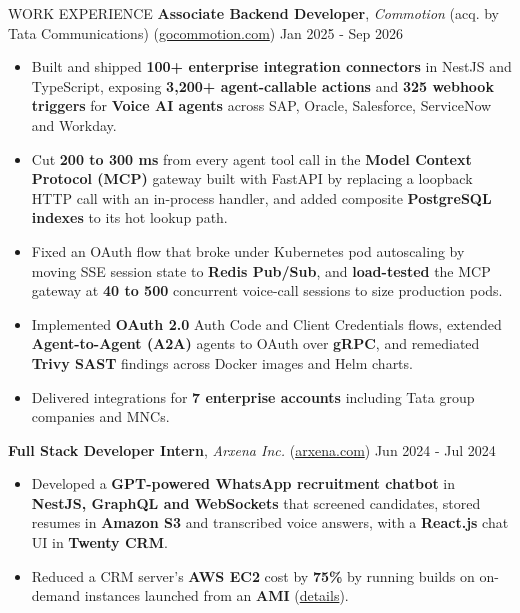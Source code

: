 \documentclass{resume} %
\begin{document}
\begin{rSection}{WORK EXPERIENCE}
\textbf{Associate Backend Developer}, \textit{Commotion} (acq. by Tata Communications) (\href{https://gocommotion.com}{gocommotion.com})  \hfill Jan 2025 - Sep 2026
\begin{itemize}
        \itemsep -6pt {}
    \item Built and shipped \textbf{100+ enterprise integration connectors} in NestJS and TypeScript, exposing \textbf{3,200+ agent-callable actions} and \textbf{325 webhook triggers} for \textbf{Voice AI agents} across SAP, Oracle, Salesforce, ServiceNow and Workday.
    \item Cut \textbf{200 to 300 ms} from every agent tool call in the \textbf{Model Context Protocol (MCP)} gateway built with FastAPI by replacing a loopback HTTP call with an in-process handler, and added composite \textbf{PostgreSQL indexes} to its hot lookup path.
    \item Fixed an OAuth flow that broke under Kubernetes pod autoscaling by moving SSE session state to \textbf{Redis Pub/Sub}, and \textbf{load-tested} the MCP gateway at \textbf{40 to 500} concurrent voice-call sessions to size production pods.
    \item Implemented \textbf{OAuth 2.0} Auth Code and Client Credentials flows, extended \textbf{Agent-to-Agent (A2A)} agents to OAuth over \textbf{gRPC}, and remediated \textbf{Trivy SAST} findings across Docker images and Helm charts.
    \item Delivered integrations for \textbf{7 enterprise accounts} including Tata group companies and MNCs.
\end{itemize}


    \textbf{Full Stack Developer Intern}, \textit{Arxena Inc.} (\href{https://arxena.com}{arxena.com})  \hfill Jun 2024 - Jul 2024

    \begin{itemize}
        \itemsep -6pt {}
         \item Developed a \textbf{GPT-powered WhatsApp recruitment chatbot} in \textbf{NestJS, GraphQL and WebSockets} that screened candidates, stored resumes in \textbf{Amazon S3} and transcribed voice answers, with a \textbf{React.js} chat UI in \textbf{Twenty CRM}.
        \item Reduced a CRM server's \textbf{AWS EC2} cost by \textbf{75\%} by running builds on on-demand instances launched from an \textbf{AMI} (\href{https://gist.github.com/ninadnaik10/7e9faf7f9d68035a5fe5a89a3a599c0d}{details}).

    \end{itemize}
\end{rSection}
\end{document}

